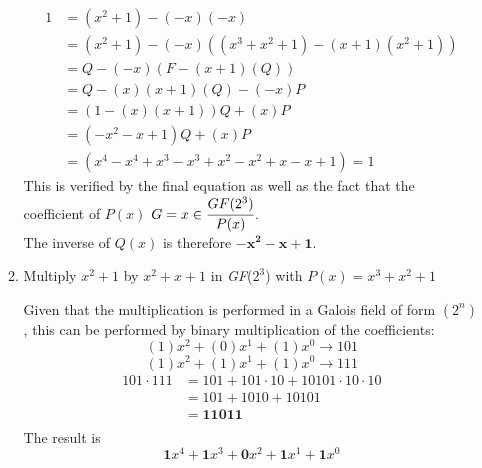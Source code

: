 \documentclass[12pt]{article}
\newenvironment{answer}
{ \begin{tcolorbox}[halign=left]
    }
    {  
  \end{tcolorbox}
}
\begin{document}
\begin{enumerate}
\begin{enumerate}
\begin{answer}
\begin{align*}
            1 &= (x^2 + 1) - (-x)(-x) \\
              &= (x^2 + 1) - (-x)((x^3 + x^2 + 1) - (x+1)(x^2 + 1)) \\
              &= Q - (-x)(F - (x+1)(Q)) \\
              &= Q - (x)(x+1)(Q) - (-x)P \\
              &= (1 - (x)(x+1))Q + (x)P \\
              &= (-x^2 -x + 1)Q + (x)P \\
              &= (x^4 - x^4 + x^3 - x^3 + x^2 - x^2 + x - x + 1) = 1
          \end{align*}
          This is verified by the final equation as well as the fact that the coefficient of $P(x)$ $G = x \in \cfrac{GF(2^3)}{P(x)}$.\\
      The inverse of $Q(x)$ is therefore $\bm{-x^2 - x + 1}$.
    \end{answer}
    \newpage
  \item Multiply $x^2+1$ by $x^2 + x + 1$ in \textit{GF}($2^3$) with $P(x) = x^3 + x^2 + 1$
    \begin{answer}
      Given that the multiplication is performed in a Galois field of form $(2^n)$, this can be performed by binary multiplication of the coefficients:
      \[ (1)x^2 + (0)x^1 + (1)x^0 \rightarrow 101 \]
      \[ (1)x^2 + (1)x^1 + (1)x^0 \rightarrow 111 \]
      \begin{align*}
        101 \cdot 111 &= 101 + 101 \cdot 10 + 10101 \cdot 10 \cdot 10 \\
                      &= 101 + 1010 + 10101 \\
                      &= \bm{11011} \\
      \end{align*}
      The result is 
      \[ \bm{1}x^4 + \bm{1}x^3 + \bm{0}x^2 + \bm{1}x^1 + \bm{1}x^0  \]
    \end{answer}
  \end{enumerate}

\end{enumerate}
\end{document}
